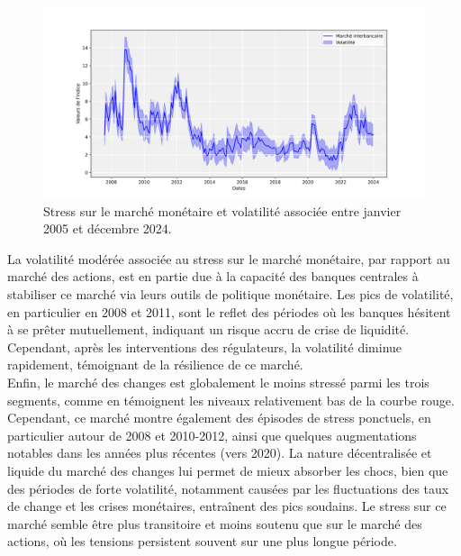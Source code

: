 \begin{figure}[H]
    \centering
    \includegraphics[width=1\linewidth]{images/sous_indicateurs_stress_imm.png}
    \caption{Stress sur le marché monétaire et volatilité associée entre janvier 2005 et décembre 2024.}
    \label{fig:enter-label}
\end{figure}

La volatilité modérée associée au stress sur le marché monétaire, par rapport au marché des actions, est en partie due à la capacité des banques centrales à stabiliser ce marché via leurs outils de politique monétaire. Les pics de volatilité, en particulier en 2008 et 2011, sont le reflet des périodes où les banques hésitent à se prêter mutuellement, indiquant un risque accru de crise de liquidité. Cependant, après les interventions des régulateurs, la volatilité diminue rapidement, témoignant de la résilience de ce marché.\\

Enfin, le marché des changes est globalement le moins stressé parmi les trois segments, comme en témoignent les niveaux relativement bas de la courbe rouge. Cependant, ce marché montre également des épisodes de stress ponctuels, en particulier autour de 2008 et 2010-2012, ainsi que quelques augmentations notables dans les années plus récentes (vers 2020). La nature décentralisée et liquide du marché des changes lui permet de mieux absorber les chocs, bien que des périodes de forte volatilité, notamment causées par les fluctuations des taux de change et les crises monétaires, entraînent des pics soudains. Le stress sur ce marché semble être plus transitoire et moins soutenu que sur le marché des actions, où les tensions persistent souvent sur une plus longue période.

